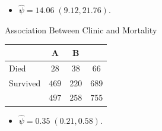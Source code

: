 \documentclass[final]{article}\usepackage[]{graphicx}\usepackage[svgnames]{xcolor}
\begin{document}
\begin{itemize}
    \item $ \hat{\psi}=14.06\;(9.12,21.76) $.
\end{itemize}
\begin{Example}{Association Between Clinic and Mortality}
    \begin{center}
        \begin{NiceTabular}{l|cc|c}
            & A                            & B &                                         \\
            \midrule
            Died & $ 28 $                            & $ 38 $                 & $ 66 $         \\
            Survived   & $ 469 $                            & $ 220 $                 & $ 689 $         \\
            \midrule
            & $ 497 $                    & $ 258 $ & $ 755 $
        \end{NiceTabular}
    \end{center}
\end{Example}
\begin{itemize}
    \item $ \hat{\psi}=0.35\;(0.21,0.58) $.
\end{itemize}
\end{document}
